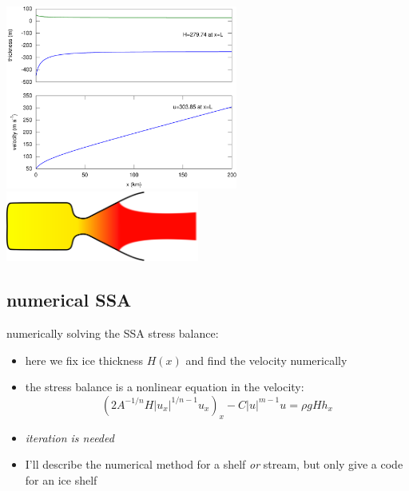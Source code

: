 \documentclass[titlepage,letterpaper,final,12pt]{scrartcl}
\newcommand{\alert}[1]{\emph{#1}}
\begin{document}
\begin{center}
  \includegraphics[width=3.0in]{steadyshelf} \hfill \includegraphics[width=2.5in]{Rocket_nozzle_expansion}
\end{center}


\subsection{numerical SSA}

numerically solving the SSA stress balance:
\begin{itemize}
\item here we fix ice thickness $H(x)$ and find the velocity numerically
\item the stress balance is a nonlinear equation in the velocity:
  $$\left(2 A^{-1/n} H |u_x|^{1/n - 1} u_x\right)_x - C|u|^{m-1}u = \rho g H h_x$$
\item \alert{iteration is needed}
\item I'll describe the numerical method for a shelf \emph{or} stream, but only give a code for an ice shelf
\end{itemize}
\end{document}
